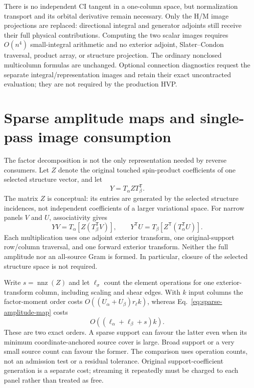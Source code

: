 \documentclass[11pt,a4paper]{article}
\newcommand{\Tr}{^{\mathsf T}}
\begin{document}
There is no independent CI tangent in a one-column space, but normalization
transport and its orbital derivative remain necessary. Only the H/M image
projections are replaced: directional integral and generator adjoints still
receive their full physical contributions. Computing the two scalar images
requires $O(n^4)$ small-integral arithmetic and no exterior adjoint,
Slater--Condon traversal, product array, or structure projection. The ordinary
nonclosed multicolumn formulas are unchanged. Optional connection diagnostics
request the separate integral/representation images and retain their exact
uncontracted evaluation; they are not required by the production HVP.

\section{Sparse amplitude maps and single-pass image consumption}
\label{sec:amplitude-map}

The factor decomposition is not the only representation needed by reverse
consumers. Let $Z$ denote the original touched spin-product coefficients of
one selected structure vector, and let
\begin{equation}
 Y=T_\alpha ZT_\beta\Tr.
\end{equation}
The matrix $Z$ is conceptual: its entries are generated by the selected
structure incidences, not independent coefficients of a larger variational
space. For narrow panels $V$ and $U$, associativity gives
\begin{equation}\label{eq:sparse-amplitude-map}
 YV=T_\alpha\left[Z(T_\beta\Tr V)\right],\qquad
 Y\Tr U=T_\beta\left[Z\Tr(T_\alpha\Tr U)\right].
\end{equation}
Each multiplication uses one adjoint exterior transform, one original-support
row/column traversal, and one forward exterior transform. Neither the full
amplitude nor an all-source Gram is formed. In particular, closure of the
selected structure space is not required.

Write $s=\operatorname{nnz}(Z)$ and let $\ell_\sigma$ count the element
operations for one exterior-transform column, including scaling and shear
edges. With $k$ input columns the factor-moment order costs
$O((U_\alpha+U_\beta)r_\ell k)$, whereas
Eq.~\eqref{eq:sparse-amplitude-map} costs
\begin{equation}
 O\left((\ell_\alpha+\ell_\beta+s)k\right).
\end{equation}
These are two exact orders. A sparse support can favour the latter even
when its minimum coordinate-anchored source cover is large. Broad support
or a very small source count can favour the former. The comparison uses
operation counts, not an admission test or a residual tolerance. Original
support-coefficient generation is a separate cost; streaming it repeatedly
must be charged to each panel rather than treated as free.
\end{document}
